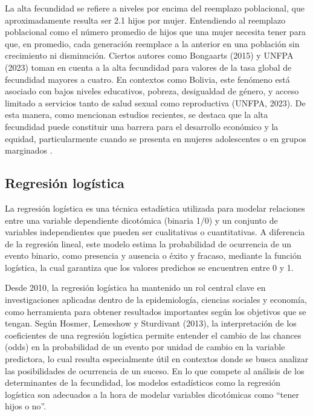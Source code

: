 \documentclass[Royal,times,sageh]{sagej}
\begin{document}
La alta fecundidad se refiere a niveles por encima del reemplazo
poblacional, que aproximadamente resulta ser 2.1 hijos por mujer.
Entendiendo al reemplazo poblacional como el número promedio de hijos
que una mujer necesita tener para que, en promedio, cada generación
reemplace a la anterior en una población sin crecimiento ni disminución.
Ciertos autores como Bongaarts (2015) y UNFPA (2023) toman en cuenta a
la alta fecundidad para valores de la tasa global de fecundidad mayores
a cuatro. En contextos como Bolivia, este fenómeno está asociado con
bajos niveles educativos, pobreza, desigualdad de género, y acceso
limitado a servicios tanto de salud sexual como reproductiva (UNFPA,
2023). De esta manera, como mencionan estudios recientes, se destaca que
la alta fecundidad puede constituir una barrera para el desarrollo
económico y la equidad, particularmente cuando se presenta en mujeres
adolescentes o en grupos marginados \citep{binstock2014entornos}.

\subsection{Regresión logística}\label{regresiuxf3n-loguxedstica}

La regresión logística es una técnica estadística utilizada para modelar
relaciones entre una variable dependiente dicotómica (binaria 1/0) y un
conjunto de variables independientes que pueden ser cualitativas o
cuantitativas. A diferencia de la regresión lineal, este modelo estima
la probabilidad de ocurrencia de un evento binario, como presencia y
ausencia o éxito y fracaso, mediante la función logística, la cual
garantiza que los valores predichos se encuentren entre 0 y 1.

Desde 2010, la regresión logística ha mantenido un rol central clave en
investigaciones aplicadas dentro de la epidemiología, ciencias sociales
y economía, como herramienta para obtener resultados importantes según
los objetivos que se tengan. Según Hosmer, Lemeshow y Sturdivant (2013),
la interpretación de los coeficientes de una regresión logística permite
entender el cambio de las chances (odds) en la probabilidad de un evento
por unidad de cambio en la variable predictora, lo cual resulta
especialmente útil en contextos donde se busca analizar las
posibilidades de ocurrencia de un suceso. En lo que compete al análisis
de los determinantes de la fecundidad, los modelos estadísticos como la
regresión logística son adecuados a la hora de modelar variables
dicotómicas como ``tener hijos o no''.
\end{document}
